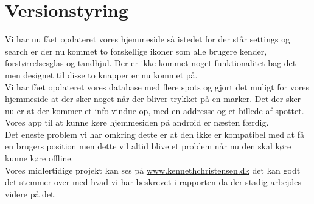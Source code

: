 \documentclass[12pt]{article}
\begin{document}
\section{Versionstyring}
Vi har nu fået opdateret vores hjemmeside så istedet for der står settings og search er der nu kommet to forskellige ikoner som alle brugere kender, forstørrelsesglas og tandhjul. Der er ikke kommet noget funktionalitet bag det men designet til disse to knapper er nu kommet på. \\
Vi har fået opdateret vores database med flere spots og gjort det muligt for vores hjemmeside at der sker noget når der bliver trykket på en marker. Det der sker nu er at der kommer et info vindue op, med en addresse og et billede af spottet.\\
Vores app til at kunne køre hjemmesiden på android er næsten færdig.\\
Det eneste problem vi har omkring dette er at den ikke er kompatibel med at få en brugers position men dette vil altid blive et problem når nu den skal køre kunne køre offline.\\
Vores midlertidige projekt kan ses på \url{www.kennethchristensen.dk} det kan godt det stemmer over med hvad vi har beskrevet i rapporten da der stadig arbejdes videre på det.\\

\pagebreak
\end{document}
